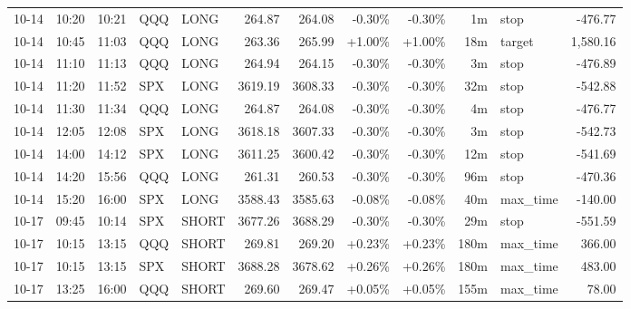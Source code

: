 \documentclass[11pt,a4paper,twoside]{article}
\begin{document}
\begin{center}
\begin{longtable}{>{\color{txtmain}}l l l l l r r r r r >{\color{txtmain}}l r}
10-14 & 10:20 & 10:21 & QQQ & LONG & 264.87 & 264.08 & \textcolor{lossred}{-0.30\%} & \textcolor{lossred}{-0.30\%} & 1m & stop & \textcolor{lossred}{-476.77} \\
10-14 & 10:45 & 11:03 & QQQ & LONG & 263.36 & 265.99 & \textcolor{wingreen}{+1.00\%} & \textcolor{wingreen}{+1.00\%} & 18m & target & \textcolor{wingreen}{1,580.16} \\
10-14 & 11:10 & 11:13 & QQQ & LONG & 264.94 & 264.15 & \textcolor{lossred}{-0.30\%} & \textcolor{lossred}{-0.30\%} & 3m & stop & \textcolor{lossred}{-476.89} \\
10-14 & 11:20 & 11:52 & SPX & LONG & 3619.19 & 3608.33 & \textcolor{lossred}{-0.30\%} & \textcolor{lossred}{-0.30\%} & 32m & stop & \textcolor{lossred}{-542.88} \\
10-14 & 11:30 & 11:34 & QQQ & LONG & 264.87 & 264.08 & \textcolor{lossred}{-0.30\%} & \textcolor{lossred}{-0.30\%} & 4m & stop & \textcolor{lossred}{-476.77} \\
10-14 & 12:05 & 12:08 & SPX & LONG & 3618.18 & 3607.33 & \textcolor{lossred}{-0.30\%} & \textcolor{lossred}{-0.30\%} & 3m & stop & \textcolor{lossred}{-542.73} \\
10-14 & 14:00 & 14:12 & SPX & LONG & 3611.25 & 3600.42 & \textcolor{lossred}{-0.30\%} & \textcolor{lossred}{-0.30\%} & 12m & stop & \textcolor{lossred}{-541.69} \\
10-14 & 14:20 & 15:56 & QQQ & LONG & 261.31 & 260.53 & \textcolor{lossred}{-0.30\%} & \textcolor{lossred}{-0.30\%} & 96m & stop & \textcolor{lossred}{-470.36} \\
10-14 & 15:20 & 16:00 & SPX & LONG & 3588.43 & 3585.63 & \textcolor{lossred}{-0.08\%} & \textcolor{lossred}{-0.08\%} & 40m & max\_time & \textcolor{lossred}{-140.00} \\
10-17 & 09:45 & 10:14 & SPX & SHORT & 3677.26 & 3688.29 & \textcolor{lossred}{-0.30\%} & \textcolor{lossred}{-0.30\%} & 29m & stop & \textcolor{lossred}{-551.59} \\
10-17 & 10:15 & 13:15 & QQQ & SHORT & 269.81 & 269.20 & \textcolor{wingreen}{+0.23\%} & \textcolor{wingreen}{+0.23\%} & 180m & max\_time & \textcolor{wingreen}{366.00} \\
10-17 & 10:15 & 13:15 & SPX & SHORT & 3688.28 & 3678.62 & \textcolor{wingreen}{+0.26\%} & \textcolor{wingreen}{+0.26\%} & 180m & max\_time & \textcolor{wingreen}{483.00} \\
10-17 & 13:25 & 16:00 & QQQ & SHORT & 269.60 & 269.47 & \textcolor{wingreen}{+0.05\%} & \textcolor{wingreen}{+0.05\%} & 155m & max\_time & \textcolor{wingreen}{78.00} \\

\end{longtable}
\end{center}
\end{document}
